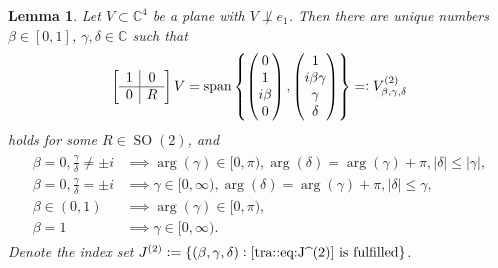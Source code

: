 \documentclass{amsart}
\newtheorem{lemma}[thm]{Lemma}
\newcommand{\C}{\mathbb{C}}
\DeclareMathOperator{\SO}{SO}
\DeclareMathOperator{\spann}{span}
\begin{document}
\begin{lemma}
    \label{t2e::lemma:classification_of_planes_V}
    Let $V\subset\C^4$ be a plane with $V\not\perp e_1$. Then there are unique numbers $\beta\in[0,1]$, $\gamma,\delta\in\C$ such that
    \begin{align*}
        \left[\begin{array}{c|c}
                1& 0 \\
                \hline
                0 & R
                \end{array}\right]
        V=
        \spann \left\{
            \begin{pmatrix}
                0 \\ 1 \\ i \beta \\ 0
            \end{pmatrix},
            \begin{pmatrix}
                1 \\ i \beta \gamma \\ \gamma \\ \delta
            \end{pmatrix}
            \right\}
            =\vcentcolon V^{(2)}_{\beta,\gamma,\delta}
    \end{align*}
    holds for some $R\in\SO(2)$, and
    \begin{align}
        \label{tra::eq:J^(2)}\tag{$\ast$}
        \begin{aligned}
            \beta=0, \frac{\gamma}{\delta}\neq\pm i &\implies \arg(\gamma)\in[0,\pi),\arg(\delta)=\arg(\gamma)+\pi,|\delta|\leq|\gamma|,\\ 
            \beta=0, \frac{\gamma}{\delta}=\pm i &\implies \gamma\in[0,\infty),\arg(\delta)=\arg(\gamma)+\pi,|\delta|\leq\gamma, \\
            \beta\in(0,1) &\implies \arg(\gamma)\in[0,\pi), \\
            \beta=1&\implies\gamma\in[0,\infty).
        \end{aligned}
    \end{align}
    Denote the index set $
        J^{(2)}\vcentcolon=
        \{(\beta,\gamma,\delta)\vcentcolon\text{\eqref{tra::eq:J^(2)} is fulfilled}\}$.
\end{lemma}
\end{document}
